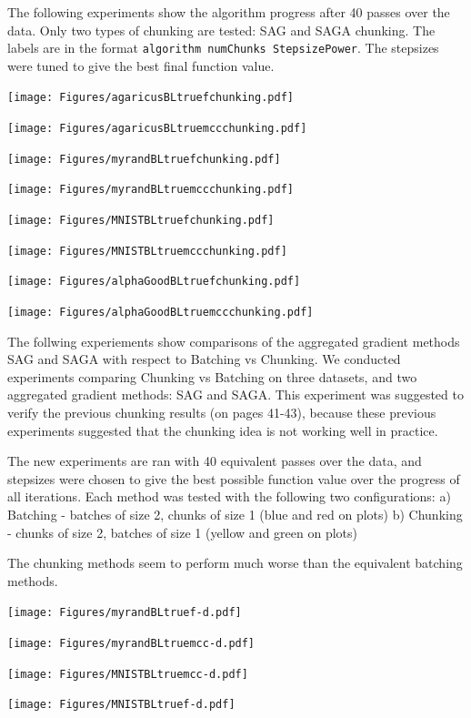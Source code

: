 \documentclass[11pt]{article}
\begin{document}
The following experiments show the algorithm progress after 40 passes over the data. Only two types of chunking are tested: SAG and SAGA chunking. The labels are in the format \texttt{algorithm numChunks StepsizePower}. The stepsizes were tuned to give the best final function value. 
     
	 \newpage
	 
\texttt{[image: Figures/agaricusBLtruefchunking.pdf]}

\texttt{[image: Figures/agaricusBLtruemccchunking.pdf]}

\texttt{[image: Figures/myrandBLtruefchunking.pdf]}

\texttt{[image: Figures/myrandBLtruemccchunking.pdf]}

\texttt{[image: Figures/MNISTBLtruefchunking.pdf]}

\texttt{[image: Figures/MNISTBLtruemccchunking.pdf]}

\texttt{[image: Figures/alphaGoodBLtruefchunking.pdf]}

\texttt{[image: Figures/alphaGoodBLtruemccchunking.pdf]}


\newpage

The follwing experiements show comparisons of the aggregated gradient methods SAG and SAGA with respect to Batching vs Chunking. We conducted experiments comparing Chunking vs Batching on three datasets, and two aggregated gradient methods: SAG and SAGA. This experiment was suggested to verify the previous chunking results (on pages 41-43), because these previous experiments suggested that the chunking idea is not working well in practice. 

The new experiments are ran with 40 equivalent passes over the data, and stepsizes were chosen to give the best possible function value over the progress of all iterations. Each method was tested with the following two configurations:
a) Batching - batches of size 2, chunks of size 1  (blue and red on plots)
b) Chunking - chunks of size 2, batches of size 1 (yellow and green on plots)

The chunking methods seem to perform much worse than the equivalent batching methods. 

\newpage 

\texttt{[image: Figures/myrandBLtruef-d.pdf]}

\texttt{[image: Figures/myrandBLtruemcc-d.pdf]}

\texttt{[image: Figures/MNISTBLtruemcc-d.pdf]}

\texttt{[image: Figures/MNISTBLtruef-d.pdf]}
\end{document}
